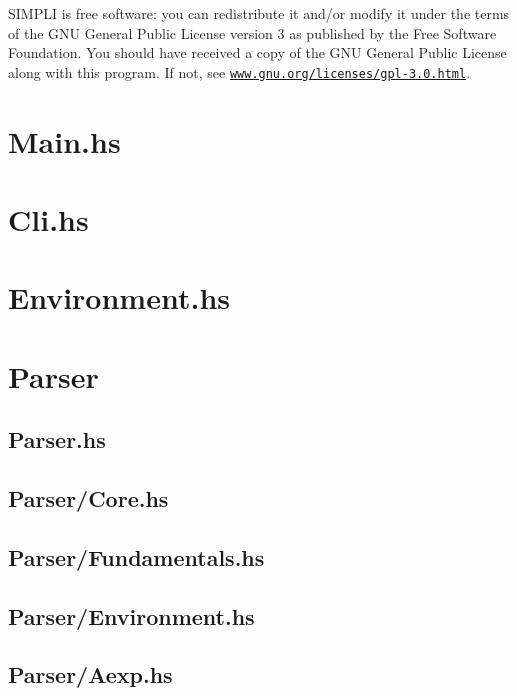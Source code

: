 \documentclass{esposito-documentation}
\begin{document}
SIMPLI is free software: you can redistribute it and/or modify it under the
terms of the GNU General Public License version 3 as published by the Free
Software Foundation. You should have received a copy of the GNU General Public
License along with this program. If not, see
\href{https://www.gnu.org/licenses/gpl-3.0.html}{\texttt{www.gnu.org/licenses/gpl-3.0.html}}.


\section{Main.hs}


\section{Cli.hs}


\section{Environment.hs}


\section{Parser}
\subsection{Parser.hs}


\subsection{Parser/Core.hs}


\subsection{Parser/Fundamentals.hs}


\subsection{Parser/Environment.hs}


\subsection{Parser/Aexp.hs}

\end{document}
